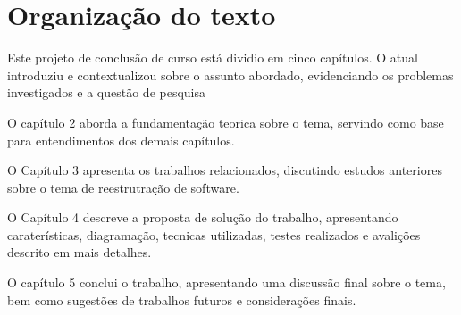     \section{Organização do texto}

    Este projeto de conclusão de curso está dividio em cinco capítulos. O atual introduziu e contextualizou sobre o assunto abordado, evidenciando os problemas investigados e a questão de pesquisa

    O capítulo 2 aborda a  fundamentação teorica sobre o tema, servindo como  base para entendimentos dos demais capítulos.

    O Capítulo 3 apresenta os trabalhos relacionados, discutindo estudos anteriores sobre o tema de reestrutração de software.

    O Capítulo 4 descreve a proposta de solução do trabalho, apresentando caraterísticas, diagramação, tecnicas utilizadas, testes realizados e avalições descrito em mais detalhes.

    O capítulo 5 conclui o trabalho, apresentando uma discussão final sobre o tema, bem como sugestões de trabalhos futuros e considerações finais.

